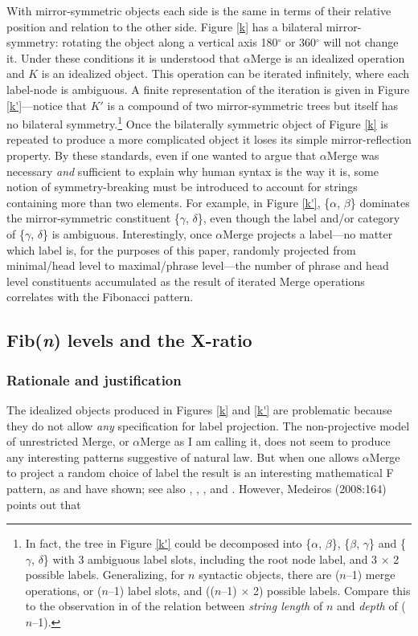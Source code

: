 \documentclass[11pt,twoside]{article}
\begin{document}
With mirror-symmetric objects each side is the same in terms of their relative position and relation to the other side. Figure \ref{k} has a bilateral mirror-symmetry: rotating the object along a vertical axis 180$^{\circ}$ or 360$^{\circ}$ will not change it. Under these conditions it is understood that $\alpha$Merge is an idealized operation and $K$ is an idealized object. This operation can be iterated infinitely, where each label-node is ambiguous. A finite representation of the iteration is given in Figure \ref{k'}---notice that $K'$ is a compound of two mirror-symmetric trees but itself has no bilateral symmetry.\footnote{In fact, the tree in Figure \ref{k'} could be decomposed into \{$\alpha$, $\beta$\}, \{$\beta$, $\gamma$\} and \{$\gamma$, $\delta$\} with 3 ambiguous label slots, including the root node label, and 3 $\times$ 2 possible labels. Generalizing, for $n$ syntactic objects, there are ($n$--1) merge operations, or ($n$--1) label slots, and (($n$--1) $\times$ 2) possible labels. Compare this to the observation in \cite{medeiros:2008} of the relation between \textsl{string length} of $n$ and \textsl{depth} of ($n$--1).} 
Once the bilaterally symmetric object of Figure \ref{k} is repeated to produce a more complicated object it loses its simple mirror-reflection property. By these standards, even if one wanted to argue that $\alpha$Merge was necessary \textsl{and} sufficient to explain why human syntax is the way it is, some notion of symmetry-breaking must be introduced to account for strings containing more than two elements. For example, in Figure \ref{k'}, \{$\alpha$, $\beta$\} dominates the mirror-symmetric constituent \{$\gamma$, $\delta$\}, even though the label and/or category of \{$\gamma$, $\delta$\} is ambiguous. Interestingly, once $\alpha$Merge projects a label---no matter which label is, for the purposes of this paper, randomly projected from minimal/head level to maximal/phrase level---the number of phrase and head level constituents accumulated as the result of iterated Merge operations correlates with the Fibonacci pattern.  


\subsection{Fib(\emph{n}) levels and the X-ratio}\label{x}
\subsubsection{Rationale and justification}
The idealized objects produced in Figures \ref{k} and \ref{k'} are problematic because they do not allow \textsl{any} specification for label projection. The non-projective model of unrestricted Merge, or $\alpha$Merge as I am calling it, does not seem to produce any interesting patterns suggestive of natural law. But when one allows $\alpha$Merge to project a random choice of label the result is an interesting mathematical F pattern, as \cite{medeiros:2008} and \cite{soschen:2008} have shown; see also \cite{bcm:2006}, \cite{cm:2005}, \cite{idsardi:2008}, and \cite{ppuriagereka:2008}. However, Medeiros (2008:164) points out that 
\end{document}
